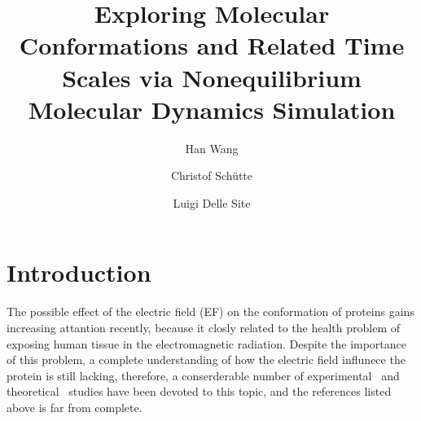 \documentclass[aip,jcp,a4paper,preprint,onecolumn]{revtex4-1}
\begin{document}
\title{Exploring Molecular Conformations and Related Time Scales via Nonequilibrium Molecular Dynamics Simulation}
\author{Han Wang}
\author{Christof Sch\"utte}
\author{Luigi Delle Site}

\begin{abstract}
\end{abstract}

\maketitle


\section{Introduction}


The possible effect of the electric field (EF) on the conformation of
proteins gains increasing attantion recently, because it closly
related to the health problem of exposing human tissue in the
electromagnetic radiation. Despite the importance of this problem, a
complete understanding of how the electric field influnece the  protein
is still lacking, therefore, a conserderable number of
experimental~\cite{bohr2000microwave, bohr2000microwave-1,
  dePomerai2000cell, inskip2001cellular, mancinelli2004non} and
theoretical~\cite{budi2005electric, budi2007effect,
  budi2008comparative, toschi2008effects, astrakas2011electric,
  astrakas2012structural, damm2012can, starzyk2013proteins,
  english2009nonequilibrium, solomentsev2012effects} studies have been devoted to this topic,
and the references listed above is far from complete.
\end{document}
